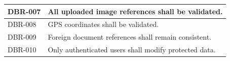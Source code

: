\begin{longtable}{|p{3cm}|p{10cm}|}
\\

\hline

DBR-007

&

All uploaded image references shall be validated.

\\

\hline

DBR-008

&

GPS coordinates shall be validated.

\\

\hline

DBR-009

&

Foreign document references shall remain consistent.

\\

\hline

DBR-010

&

Only authenticated users shall modify protected data.

\\

\hline

\end{longtable}

